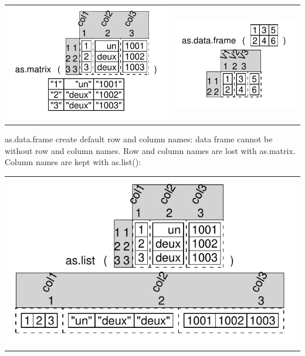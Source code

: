 \documentclass[pdflatex]{article}
\begin{document}
\begin{tabular}{cc}
\includegraphics{dataframe_as_matrix} & \includegraphics{dataframe_as_data_frame}\\
\end{tabular}

as.data.frame create default row and column names: data frame cannot be without
row and column names. Row and column names are lost with as.matrix. Column names are kept with as.list():

\begin{tabular}{c}
\includegraphics{dataframe_as_list}
\end{tabular}
\end{document}

